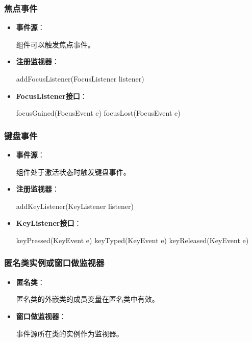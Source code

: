 \documentclass[a4paper, 10pt]{ctexart}
\begin{document}
\subsubsection{焦点事件}
\begin{itemize}
  \item \textbf{事件源}：
  \begin{codeblock}
组件可以触发焦点事件。
  \end{codeblock}
  \item \textbf{注册监视器}：
  \begin{codeblock}
addFocusListener(FocusListener listener)
  \end{codeblock}
  \item \textbf{FocusListener接口}：
  \begin{codeblock}
focusGained(FocusEvent e)
focusLost(FocusEvent e)
  \end{codeblock}
\end{itemize}

\subsubsection{键盘事件}
\begin{itemize}
  \item \textbf{事件源}：
  \begin{codeblock}
组件处于激活状态时触发键盘事件。
  \end{codeblock}
  \item \textbf{注册监视器}：
  \begin{codeblock}
addKeyListener(KeyListener listener)
  \end{codeblock}
  \item \textbf{KeyListener接口}：
  \begin{codeblock}
keyPressed(KeyEvent e)
keyTyped(KeyEvent e)
keyReleased(KeyEvent e)
  \end{codeblock}
\end{itemize}

\subsubsection{匿名类实例或窗口做监视器}
\begin{itemize}
  \item \textbf{匿名类}：
  \begin{codeblock}
匿名类的外嵌类的成员变量在匿名类中有效。
  \end{codeblock}
  \item \textbf{窗口做监视器}：
  \begin{codeblock}
事件源所在类的实例作为监视器。
  \end{codeblock}
\end{itemize}
\end{document}
